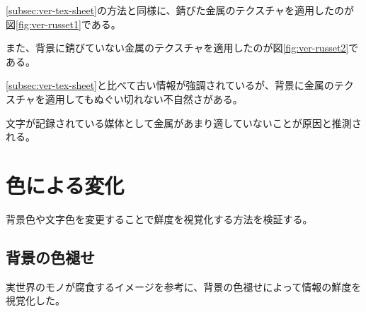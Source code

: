 \ref{subsec:ver-tex-sheet}の方法と同様に、錆びた金属のテクスチャを適用したのが図\ref{fig:ver-russet1}である。

また、背景に錆びていない金属のテクスチャを適用したのが図\ref{fig:ver-russet2}である。

\ref{subsec:ver-tex-sheet}と比べて古い情報が強調されているが、背景に金属のテクスチャを適用してもぬぐい切れない不自然さがある。

文字が記録されている媒体として金属があまり適していないことが原因と推測される。

\section{色による変化}
\label{sec:ver-color}

背景色や文字色を変更することで鮮度を視覚化する方法を検証する。

\subsection{背景の色褪せ}
\label{subsec:ver-col-cor}

実世界のモノが腐食するイメージを参考に、背景の色褪せによって情報の鮮度を視覚化した。

